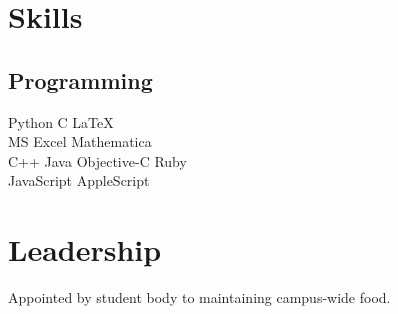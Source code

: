 \documentclass[letterpaper]{deedy-resume} %
\begin{document}
\begin{minipage}[t]{0.39\textwidth}

\section{Skills}

\subsection{Programming}

Python \textbullet{} C \textbullet{} \LaTeX \\
MS Excel \textbullet{} Mathematica\\
C++ \textbullet{} Java \textbullet{} Objective-C \textbullet{} Ruby\\
JavaScript \textbullet{} AppleScript\\


\sectionspace %





\section{Leadership}


\indent 

\begin{tightitemize}
	\item Appointed by student body to maintaining campus-wide food.
\end{tightitemize}


\end{minipage}
\end{document}
